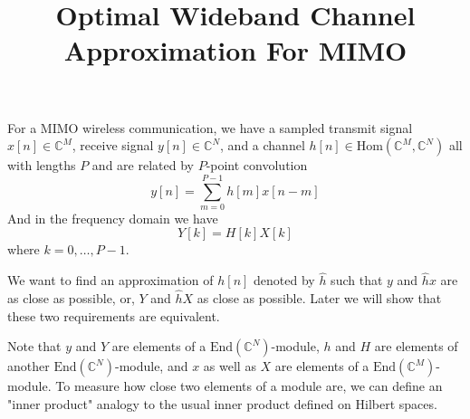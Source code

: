\documentclass[12pt]{article}
\title{Optimal Wideband Channel Approximation For MIMO}
\theoremstyle{definition}
\begin{document}
\maketitle
For a MIMO wireless communication, we have a sampled transmit signal $x[n]\in\mathbb{C}^M$, receive signal $y[n]\in\mathbb{C}^N$, and a channel $h[n]\in\mbox{Hom}\left(\mathbb{C}^M, \mathbb{C}^N\right)$ all with lengths $P$ and are related by $P$-point convolution
$$y[n]=\sum_{m=0}^{P-1}h[m]x[n-m]$$
And in the frequency domain we have
$$Y[k]=H[k]X[k]$$
where $k=0,\dots,P-1$.

We want to find an approximation of $h[n]$ denoted by $\hat{h}$ such that $y$ and $\hat{h}x$ are as close as possible, or, $Y$ and $\hat{h}X$ as close as possible. Later we will show that these two requirements are equivalent.

Note that $y$ and $Y$ are elements of a $\mbox{End}\left(\mathbb{C}^N \right)$-module, $h$ and $H$ are elements of another $\mbox{End}\left(\mathbb{C}^N \right)$-module, and $x$ as well as $X$ are elements of a $\mbox{End}\left(\mathbb{C}^M \right)$-module. To measure how close two elements of a module are, we can define an "inner product" analogy to the usual inner product defined on Hilbert spaces.
\end{document}
